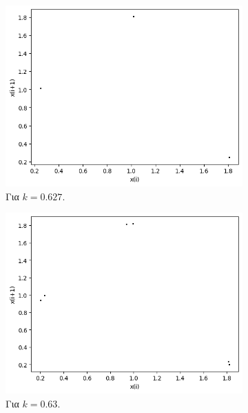 \begin{figure}[h!]
\begin{subfigure}[b]{0.4\textwidth}
		\includegraphics[width=\textwidth]{LateX images/graphs q07/g10}
		\caption{Για $k=0.627$.}
		\label{f:k44}
	\end{subfigure}
	\hfill
	\begin{subfigure}[b]{0.4\textwidth}
		\centering
		\includegraphics[width=\textwidth]{LateX images/graphs q07/g11}
		\caption{Για $k=0.63$.}
		\label{f:k45}
	\end{subfigure}
	\hfill
	\begin{subfigure}[b]{0.4\textwidth}
		\centering

\end{subfigure}
\end{figure}
